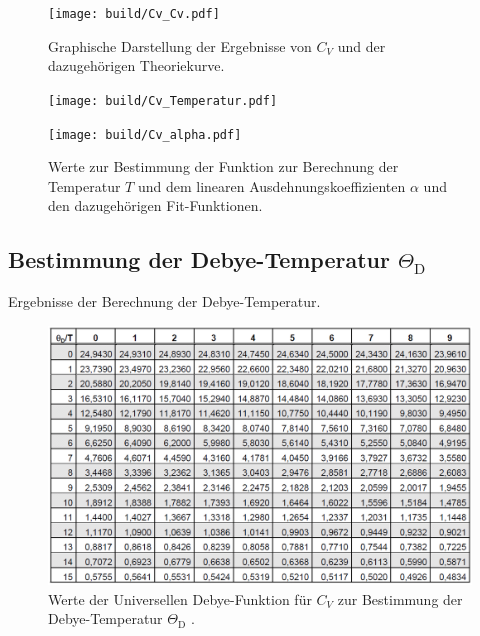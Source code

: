 \begin{figure}
	\centering
	\texttt{[image: build/Cv\_Cv.pdf]}
	\caption[]{Graphische Darstellung der Ergebnisse von $C_V$ und der dazugehörigen Theoriekurve.}
	\label{Cv_gra}
\end{figure}

\begin{figure}
	\begin{minipage}{8cm}
		\texttt{[image: build/Cv\_Temperatur.pdf]}
	\end{minipage}
	\hfill
	\begin{minipage}{8cm}
		\texttt{[image: build/Cv\_alpha.pdf]}
	\end{minipage}
	\caption[]{Werte zur Bestimmung der Funktion zur Berechnung der Temperatur $T$ und dem linearen Ausdehnungskoeffizienten $\alpha$ und den dazugehörigen Fit-Funktionen.}
\end{figure}

\subsection{Bestimmung der Debye-Temperatur $\Theta_\mathrm{D}$} %
\label{sub:bestimmung_der_debye_temperatur_theta_mathrm}

\begin{table}[!h]
	\centering
	\caption[]{Ergebnisse der Berechnung der Debye-Temperatur.}
	
	\label{Theta_Debye}
\end{table}

\begin{figure}[!h]
	\centering
	\includegraphics[width = 14cm]{img/theta.png}
	\caption[]{Werte der Universellen Debye-Funktion für $C_V$ zur Bestimmung der Debye-Temperatur $\Theta_\mathrm{D}$ \cite{V47}.}
	\label{Cv_global}
\end{figure}

